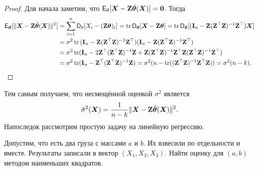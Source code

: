 \begin{proof}
	Для начала заметим, что $\operatorname{\mathsf{E}}_{\theta}[\bm{X} - \mathbf{Z}\hat{\bm{\theta}}(\bm{X})] = \bm{0}$. Тогда
	\begin{align*}
		\operatorname{\mathsf{E}}_{\bm{\theta}}[\|\bm{X} - \mathbf{Z}\hat{\bm{\theta}}(\bm{X})\|^{2}]
		&= \sum_{i = 1}^{n} \operatorname{\mathsf{D}}_{\theta}[X_{i} - (\mathbf{Z}\bm{\theta})_{i}]
		= \operatorname{tr}{\operatorname{\mathsf{D}}_{\bm{\theta}}[\bm{X} - \mathbf{Z}\bm{\theta}]}
		= \operatorname{tr}{\operatorname{\mathsf{D}}_{\bm{\theta}}[(\mathbf{I}_{n} - \mathbf{Z}(\mathbf{Z}^{\top}\mathbf{Z})^{-1}\mathbf{Z}^{\top})\bm{X}]} \\
		&= \sigma^{2}\operatorname{tr}{(\mathbf{I}_{n} - \mathbf{Z}(\mathbf{Z}^{\top}\mathbf{Z})^{-1}\mathbf{Z}^{\top})(\mathbf{I}_{n} - \mathbf{Z}(\mathbf{Z}^{\top}\mathbf{Z})^{-1}\mathbf{Z}^{\top})} \\
		&= \sigma^{2}\operatorname{tr}(\mathbf{I}_{n} - 2\mathbf{Z}^{\top}(\mathbf{Z}^{\top}\mathbf{Z})^{-1}\mathbf{Z} + \mathbf{Z}(\mathbf{Z}^{\top}\mathbf{Z})^{-1}\mathbf{Z}^{\top}\mathbf{Z}(\mathbf{Z}^{\top}\mathbf{Z})^{-1}\mathbf{Z}^{\top}) \\
		&= \sigma^{2}\operatorname{tr}(\mathbf{I}_{n} - \mathbf{Z}^{\top}(\mathbf{Z}^{\top}\mathbf{Z})^{-1}\mathbf{Z})
		= \sigma^{2}(n - \operatorname{tr}((\mathbf{Z}^{\top}\mathbf{Z})^{-1}\mathbf{Z}^{\top}\mathbf{Z}))
		= \sigma^{2}(n - k). \qedhere
	\end{align*}
\end{proof}	
Тем самым получаем, что несмещённой оценкой $\sigma^{2}$ является
\[
	\hat{\sigma}^{2}(\bm{X})
	= \frac{1}{n - k}\|\bm{X} - \mathbf{Z}\hat{\bm{\theta}}(\bm{X})\|^{2}.
\]
Напоследок рассмотрим простую задачу на линейную регрессию.
\begin{problem}
	Допустим, что есть два груза с массами $a$ и $b$. Их взвесили по отдельности и вместе. Результаты записали в вектор $(X_{1}, X_{2}, X_{3})$. Найти оценку для $(a, b)$ методом наименьших квадратов.
\end{problem}
